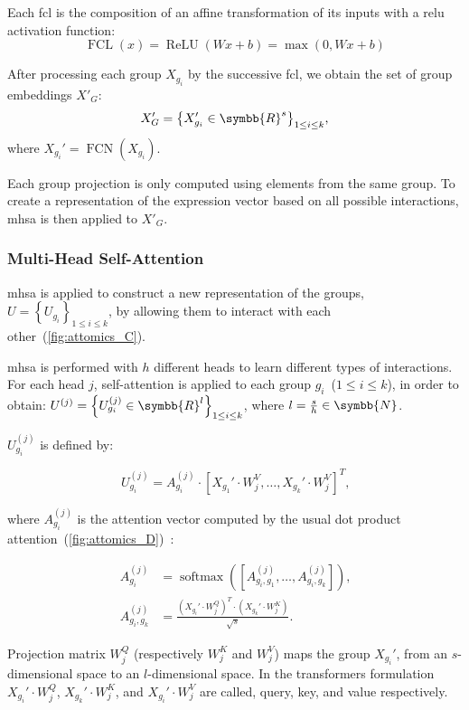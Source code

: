 \documentclass[../main.tex]{subfiles}
\begin{document}
			Each \gls{fcl} is the composition of an affine transformation of its inputs with a \gls{relu} activation function:
			\[ \operatorname{FCL}\left(x\right) = \operatorname{ReLU}\left(Wx+b \right) = \max\left(0, Wx+b\right) \]

			After processing each group \(X_{g_i}\) by the successive \gls{fcl}, we obtain the set of group embeddings \(X'_G\):
			\[ X_G' = {\left\{ X_{g_i}' \in \symbb{R}^{s}\right\}}_{1 \leq i \leq k} \text{,} \]
			where \(X_{g_i}' = \operatorname{FCN}\left(X_{g_i}\right)\).

			Each group projection is only computed using elements from the same group.
			To create a representation of the expression vector based on all possible interactions, \gls{mhsa} is then applied to \(X'_G\).

		\subsubsection{Multi-Head Self-Attention}

			\Gls{mhsa} is applied to construct a new representation of the groups, \(U = {\left\{ U_{g_i}\right\}}_{1 \leq i \leq k}\), by allowing them to interact with each other~(\cref{fig:attomics_C}).

			\Gls{mhsa} is performed with \(h\) different heads to learn different types of interactions.
			For each head \(j\), self-attention is applied to each group \(g_i\)~(\(1 \leq i \leq k \)), in order to obtain: \(U^{(j)} = {\left\{ U^{(j)}_{g_i} \in \symbb{R}^{l} \right\}}_{1 \leq i \leq k}\), where \(l = \frac{s}{h} \in \symbb{N}\).

			\(U^{(j)}_{g_i}\) is defined by:

			\[ U^{(j)}_{g_i} = A^{(j)}_{g_i} \cdot {\left[ X_{g_1}' \cdot W_j^V, \ldots ,  X_{g_k}' \cdot W_j^V\right]}^T \text{,}\]

			where \(A^{(j)}_{g_i}\) is the attention vector computed by the usual dot product attention~(\cref{fig:attomics_D})~\cite{vaswaniAttentionAllYou2017}:

			\begin{align*}
				A^{(j)}_{g_i}      & = \operatorname{softmax}\left(\left[A^{(j)}_{g_i,g_1}, \ldots,  A^{(j)}_{g_i,g_k}\right]\right) \text{,}    \\
				A^{(j)}_{g_i, g_k} & =  \frac{{\left(X_{g_i}' \cdot W_j^Q\right)}^T \cdot \left(X_{g_k}' \cdot W_j^K \right)}{\sqrt{s}} \text{.}
			\end{align*}

			Projection matrix \(W^Q_j\) (respectively \(W^K_j\) and \(W^V_j\)) maps the group \(X_{g_i}'\), from an \(s\)-dimensional space to an \(l\)-dimensional space.
			In the transformers formulation \(X_{g_i}' \cdot W_j^Q\), \(X_{g_k}' \cdot W^K_j\), and \(X_{g_i}' \cdot W^V_j\) are called, query, key, and value respectively.
\end{document}
